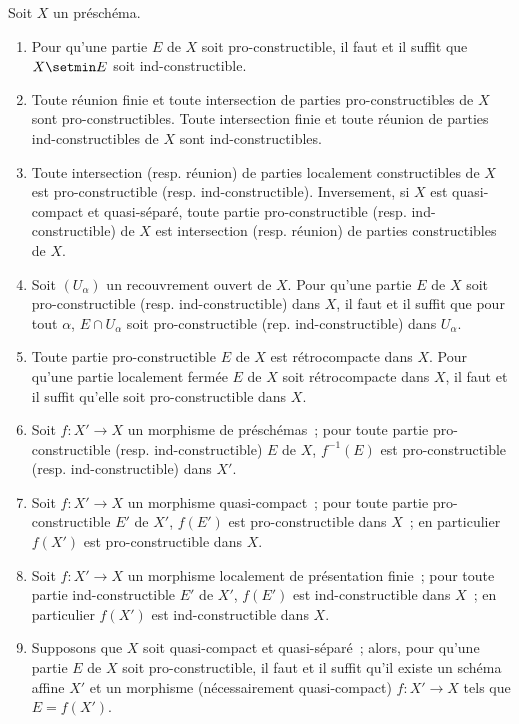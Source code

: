 \begin{proposition}[1.9.5]
\label{IV.1.9.5-fr}
Soit $X$ un préschéma.
\begin{enumerate}
  \item[\textup{(i)}] Pour qu'une partie $E$ de $X$ soit pro-constructible, il faut et
  il suffit que $X\setmin E$ soit ind-constructible.
  \item[\textup{(ii)}] Toute réunion finie et toute intersection de parties
  pro-constructibles de $X$ sont pro-constructibles. Toute intersection
  finie et toute réunion de parties ind-constructibles de $X$ sont
  ind-constructibles.
  \item[\textup{(iii)}] Toute intersection \textup{(resp.} réunion\textup{)} de parties localement
  constructibles de $X$ est pro-constructible \textup{(resp.} ind-constructible\textup{)}.
  Inversement, si $X$ est quasi-compact et quasi-séparé, toute partie
  pro-constructible \textup{(resp.} ind-constructible\textup{)} de $X$ est intersection \textup{(resp.}
  réunion\textup{)} de parties constructibles de $X$.
  \item[\textup{(iv)}] Soit $(U_\alpha)$ un recouvrement ouvert de $X$. Pour qu'une
  partie $E$ de $X$ soit pro-constructible \textup{(resp.} ind-constructible\textup{)} dans
  $X$, il faut et il suffit que pour tout $\alpha$, $E\cap U_\alpha$ soit
  pro-constructible \textup{(rep.} ind-constructible\textup{)} dans $U_\alpha$.
  \item[\textup{(v)}] Toute partie pro-constructible $E$ de $X$ est rétrocompacte
  dans $X$. Pour qu'une partie localement fermée $E$ de $X$ soit
  rétrocompacte dans $X$, il faut et il suffit qu'elle soit
  pro-constructible dans $X$.
  \item[\textup{(vi)}] Soit $f:X'\to X$ un morphisme de préschémas~; pour toute partie
  pro-constructible \textup{(resp.} ind-constructible\textup{)} $E$ de $X$, $f^{-1}(E)$ est
  pro-constructible \textup{(resp.} ind-constructible\textup{)} dans $X'$.
  \item[\textup{(vii)}] Soit $f:X'\to X$ un morphisme quasi-compact~; pour toute
  partie pro-constructible $E'$ de $X'$, $f(E')$ est pro-constructible dans
  $X$~; en particulier $f(X')$ est pro-constructible dans $X$.
  \item[\textup{(viii)}] Soit $f:X'\to X$ un morphisme localement de présentation
  finie~; pour toute partie ind-constructible $E'$ de $X'$, $f(E')$ est
  ind-constructible dans $X$~; en particulier $f(X')$ est ind-constructible
  dans $X$.
  \item[\textup{(ix)}] Supposons que $X$ soit quasi-compact et quasi-séparé~; alors,
  pour qu'une partie $E$ de $X$ soit pro-constructible, il faut et il suffit
  qu'il existe un schéma affine $X'$ et un morphisme (nécessairement
  quasi-compact) $f:X'\to X$ tels que $E=f(X')$.
\end{enumerate}
\end{proposition}

